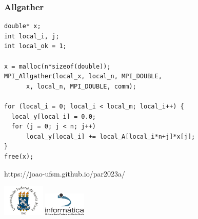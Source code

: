 \documentclass[xcolor={usenames,dvipsnames},12pt,presentation,aspectratio=169]{beamer}
\begin{document}
\begin{frame}[fragile]
  \frametitle{Allgather}
\begin{center}
\begin{minipage}{0.95\textwidth}
  \begin{verbatim}
double* x;
int local_i, j;
int local_ok = 1;

x = malloc(n*sizeof(double));
MPI_Allgather(local_x, local_n, MPI_DOUBLE,
      x, local_n, MPI_DOUBLE, comm);

for (local_i = 0; local_i < local_m; local_i++) {
  local_y[local_i] = 0.0;
  for (j = 0; j < n; j++)
      local_y[local_i] += local_A[local_i*n+j]*x[j];
}
free(x);  
  \end{verbatim}
\end{minipage}
\end{center}
\end{frame}
\begin{frame}[plain]{}
  \begin{center}
    \vspace{2cm}
    \Large{https://joao-ufsm.github.io/par2023a/}
    
    \vspace{1cm}
    \includegraphics[width=2cm]{logo_ufsm}
    \hspace{0.5cm}
    \includegraphics[width=2cm]{logo_inf}
  \end{center}
\end{frame}
\end{document}
